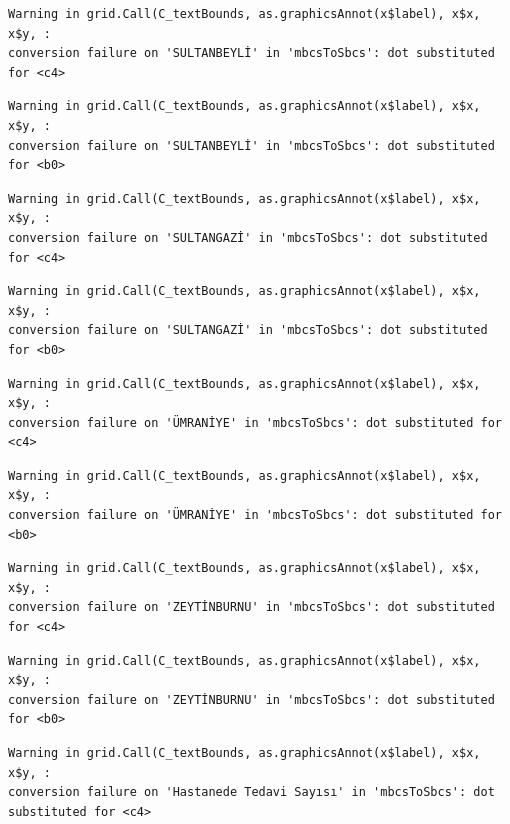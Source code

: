 \documentclass[
  11pt,
  a4paper,
  DIV=11,
  numbers=noendperiod]{scrartcl}
\begin{document}
\begin{verbatim}
Warning in grid.Call(C_textBounds, as.graphicsAnnot(x$label), x$x, x$y, :
conversion failure on 'SULTANBEYLİ' in 'mbcsToSbcs': dot substituted for <c4>
\end{verbatim}

\begin{verbatim}
Warning in grid.Call(C_textBounds, as.graphicsAnnot(x$label), x$x, x$y, :
conversion failure on 'SULTANBEYLİ' in 'mbcsToSbcs': dot substituted for <b0>
\end{verbatim}

\begin{verbatim}
Warning in grid.Call(C_textBounds, as.graphicsAnnot(x$label), x$x, x$y, :
conversion failure on 'SULTANGAZİ' in 'mbcsToSbcs': dot substituted for <c4>
\end{verbatim}

\begin{verbatim}
Warning in grid.Call(C_textBounds, as.graphicsAnnot(x$label), x$x, x$y, :
conversion failure on 'SULTANGAZİ' in 'mbcsToSbcs': dot substituted for <b0>
\end{verbatim}

\begin{verbatim}
Warning in grid.Call(C_textBounds, as.graphicsAnnot(x$label), x$x, x$y, :
conversion failure on 'ÜMRANİYE' in 'mbcsToSbcs': dot substituted for <c4>
\end{verbatim}

\begin{verbatim}
Warning in grid.Call(C_textBounds, as.graphicsAnnot(x$label), x$x, x$y, :
conversion failure on 'ÜMRANİYE' in 'mbcsToSbcs': dot substituted for <b0>
\end{verbatim}

\begin{verbatim}
Warning in grid.Call(C_textBounds, as.graphicsAnnot(x$label), x$x, x$y, :
conversion failure on 'ZEYTİNBURNU' in 'mbcsToSbcs': dot substituted for <c4>
\end{verbatim}

\begin{verbatim}
Warning in grid.Call(C_textBounds, as.graphicsAnnot(x$label), x$x, x$y, :
conversion failure on 'ZEYTİNBURNU' in 'mbcsToSbcs': dot substituted for <b0>
\end{verbatim}

\begin{verbatim}
Warning in grid.Call(C_textBounds, as.graphicsAnnot(x$label), x$x, x$y, :
conversion failure on 'Hastanede Tedavi Sayısı' in 'mbcsToSbcs': dot
substituted for <c4>
\end{verbatim}
\end{document}
